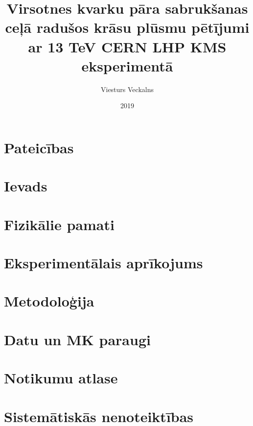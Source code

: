 \documentclass[titlepage, a4paper, LV, SHORT]{mythesis}
\title{Virsotnes kvarku pāra sabrukšanas ceļā radušos krāsu plūsmu pētījumi ar 13 TeV CERN LHP KMS eksperimentā}
\author{Viesturs Veckalns}
\date{2019}
\begin{document}
\maketitle
\begin{abstract}
        
\end{abstract}

\chapter*{Pateicības}
\label{chap:acknowledgements}


\tableofcontents
\printglossary[toctitle=Terminu tulkojumi, title=Latviešu-angļu terminu tulkojumi]

\chapter{Ievads}
\label{chap:introduction}


\chapter{Fizikālie pamati}


\chapter{Eksperimentālais aprīkojums}


\chapter{Metodoloģija}
\label{chap:methodology}


\chapter{Datu un MK paraugi}


\chapter{Notikumu atlase}
\label{chap:event_selection}


\chapter{Sistemātiskās nenoteiktības}
\label{chap:systematic_uncertainties}

\end{document}
